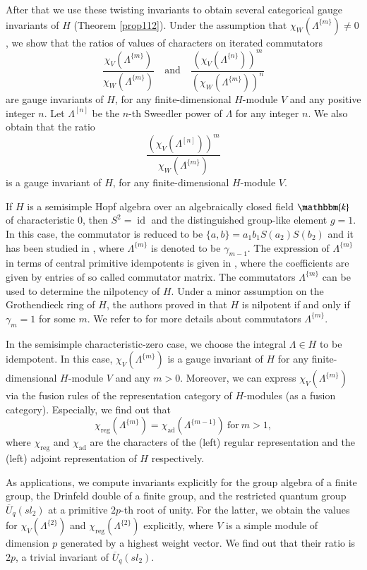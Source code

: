 \documentclass[11pt]{amsart}
\numberwithin{equation}{section}
\begin{document}
After that we use these twisting invariants to obtain several categorical gauge invariants of $H$ (Theorem \ref{prop112}). Under the assumption that $\chi_W(\Lambda^{\{m\}})\neq0$, we show that the ratios of values of characters on iterated commutators
\[
\frac{\chi_V(\Lambda^{\{m\}})}{\chi_W(\Lambda^{\{m\}})}
\quad \text{and}\quad
\frac{(\chi_{V}(\Lambda^{\{n\}}))^m}{(\chi_{W}(\Lambda^{\{m\}}))^n}
\]
are gauge invariants of $H$, for any finite-dimensional $H$-module $V$ and any positive integer $n$. Let $\Lambda^{[n]}$ be the $n$-th Sweedler power of $\Lambda$ for any integer $n$.
We also obtain that the ratio
\[
\frac{(\chi_V(\Lambda^{[n]}))^m}{\chi_W(\Lambda^{\{m\}})}
\]
is a  gauge invariant of $H$,  for any finite-dimensional $H$-module $V$.
 
 
If $H$ is a semisimple Hopf algebra over an algebraically closed field $\mathbbm{k}$ of characteristic 0, then $S^2=\operatorname{id}$ and the distinguished group-like element $g=1$. In this case, the commutator is reduced to be $\{a,b\}=a_1b_1S(a_2)S(b_2)$ and it has been studied in \cite{CW}, where $\Lambda^{\{m\}}$ is denoted to be $\gamma_{m-1}$. The expression of $\Lambda^{\{m\}}$ in terms of central primitive idempotents is given in \cite[Proposition 2.2]{CW}, where the coefficients are given by entries of so called commutator matrix. The commutators  $\Lambda^{\{m\}}$ can be used to determine the nilpotency of $H$. Under a minor assumption on the Grothendieck ring of $H$, the authors proved in \cite[Theorem 2.6]{CW} that $H$ is nilpotent if and only if $\gamma_m=1$ for some $m$. We refer to \cite[Section 2]{CW} for more details about commutators $\Lambda^{\{m\}}$. 

In the semisimple characteristic-zero case, we choose the integral $\Lambda\in H$ to be idempotent. In this case,  $\chi_V(\Lambda^{\{m\}})$ is a gauge invariant of $H$ for any  finite-dimensional $H$-module $V$ and any $m>0$. Moreover, we can express $\chi_V(\Lambda^{\{m\}})$ via the fusion rules of the representation category of $H$-modules (as a fusion category). Especially, we find out that  $$\chi_{\operatorname{reg}}(\Lambda^{\{m\}})=\chi_{\operatorname{ad}}(\Lambda^{\{m-1\}})\ \text{for}\ m>1,$$ where $\chi_{\operatorname{reg}}$ and $\chi_{\operatorname{ad}}$ are the characters of the (left) regular representation and the (left) adjoint representation of $H$ respectively.

As applications, we compute invariants explicitly for the group algebra of a finite group, the Drinfeld double of a finite group, and the restricted quantum group $\overline{U}_q(sl_2)$ at a primitive $2p$-th root of unity. For the latter, we obtain the values for $\chi_V(\Lambda^{\{2\}})$ and $\chi_{\operatorname{reg}}(\Lambda^{\{2\}})$ explicitly, where $V$ is a simple module of dimension $p$ generated by a highest weight vector. We find out that their ratio is $2p$,  a trivial invariant of  $\overline{U}_q(sl_2)$.
\end{document}
